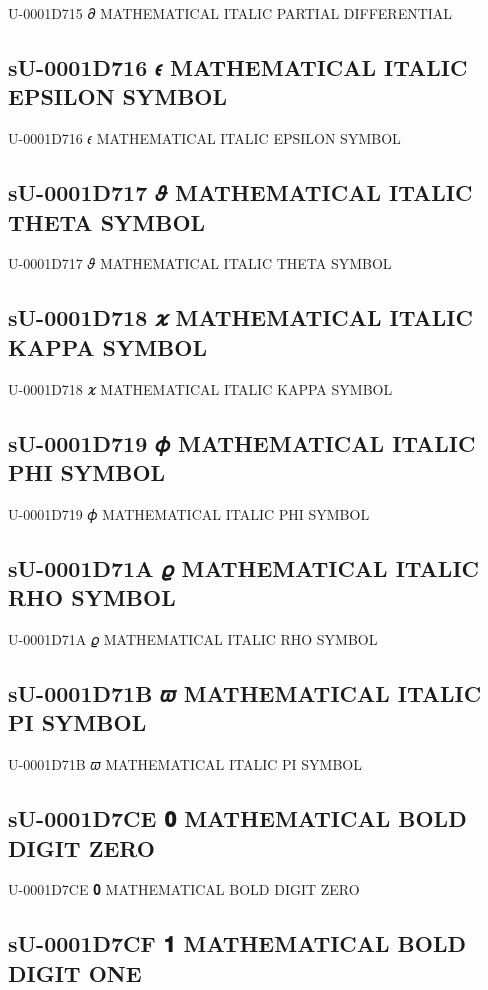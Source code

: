 U-0001D715 𝜕 MATHEMATICAL ITALIC PARTIAL DIFFERENTIAL

\subsection{sU-0001D716 𝜖 MATHEMATICAL ITALIC EPSILON SYMBOL}

U-0001D716 𝜖 MATHEMATICAL ITALIC EPSILON SYMBOL

\subsection{sU-0001D717 𝜗 MATHEMATICAL ITALIC THETA SYMBOL}

U-0001D717 𝜗 MATHEMATICAL ITALIC THETA SYMBOL

\subsection{sU-0001D718 𝜘 MATHEMATICAL ITALIC KAPPA SYMBOL}

U-0001D718 𝜘 MATHEMATICAL ITALIC KAPPA SYMBOL

\subsection{sU-0001D719 𝜙 MATHEMATICAL ITALIC PHI SYMBOL}

U-0001D719 𝜙 MATHEMATICAL ITALIC PHI SYMBOL

\subsection{sU-0001D71A 𝜚 MATHEMATICAL ITALIC RHO SYMBOL}

U-0001D71A 𝜚 MATHEMATICAL ITALIC RHO SYMBOL

\subsection{sU-0001D71B 𝜛 MATHEMATICAL ITALIC PI SYMBOL}

U-0001D71B 𝜛 MATHEMATICAL ITALIC PI SYMBOL

\subsection{sU-0001D7CE 𝟎 MATHEMATICAL BOLD DIGIT ZERO}

U-0001D7CE 𝟎 MATHEMATICAL BOLD DIGIT ZERO

\subsection{sU-0001D7CF 𝟏 MATHEMATICAL BOLD DIGIT ONE}

